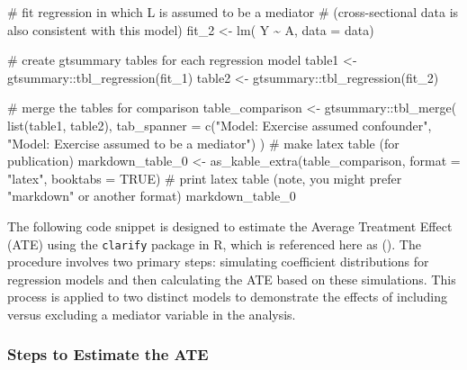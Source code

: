 \documentclass[
  singlecolumn]{article}
\newenvironment{Shaded}{}{}
\newcommand{\AttributeTok}[1]{\textcolor[rgb]{0.84,0.23,0.29}{#1}}
\newcommand{\CommentTok}[1]{\textcolor[rgb]{0.42,0.45,0.49}{#1}}
\newcommand{\ConstantTok}[1]{\textcolor[rgb]{0.00,0.36,0.77}{#1}}
\newcommand{\FunctionTok}[1]{\textcolor[rgb]{0.44,0.26,0.76}{#1}}
\newcommand{\NormalTok}[1]{\textcolor[rgb]{0.14,0.16,0.18}{#1}}
\newcommand{\OtherTok}[1]{\textcolor[rgb]{0.44,0.26,0.76}{#1}}
\newcommand{\SpecialCharTok}[1]{\textcolor[rgb]{0.00,0.36,0.77}{#1}}
\newcommand{\StringTok}[1]{\textcolor[rgb]{0.01,0.18,0.38}{#1}}
\begin{document}
\begin{Shaded}
\begin{Highlighting}[]
\CommentTok{\# fit regression in which L is assumed to be a mediator}
\CommentTok{\# (cross{-}sectional data is also consistent with this model)}
\NormalTok{fit\_2 }\OtherTok{\textless{}{-}} \FunctionTok{lm}\NormalTok{( Y }\SpecialCharTok{\textasciitilde{}}\NormalTok{ A, }\AttributeTok{data =}\NormalTok{ data)}

\CommentTok{\# create gtsummary tables for each regression model}
\NormalTok{table1 }\OtherTok{\textless{}{-}}\NormalTok{ gtsummary}\SpecialCharTok{::}\FunctionTok{tbl\_regression}\NormalTok{(fit\_1)}
\NormalTok{table2 }\OtherTok{\textless{}{-}}\NormalTok{ gtsummary}\SpecialCharTok{::}\FunctionTok{tbl\_regression}\NormalTok{(fit\_2)}

\CommentTok{\# merge the tables for comparison}
\NormalTok{table\_comparison }\OtherTok{\textless{}{-}}\NormalTok{ gtsummary}\SpecialCharTok{::}\FunctionTok{tbl\_merge}\NormalTok{(}
  \FunctionTok{list}\NormalTok{(table1, table2),}
  \AttributeTok{tab\_spanner =} \FunctionTok{c}\NormalTok{(}\StringTok{"Model: Exercise assumed confounder"}\NormalTok{, }
                  \StringTok{"Model: Exercise assumed to be a mediator"}\NormalTok{)}
\NormalTok{)}
\CommentTok{\# make latex table (for publication)}
\NormalTok{markdown\_table\_0 }\OtherTok{\textless{}{-}} \FunctionTok{as\_kable\_extra}\NormalTok{(table\_comparison, }
                                   \AttributeTok{format =} \StringTok{"latex"}\NormalTok{, }
                                   \AttributeTok{booktabs =} \ConstantTok{TRUE}\NormalTok{)}
\CommentTok{\# print latex table (note, you might prefer "markdown" or another format)                                }
\NormalTok{markdown\_table\_0}
\end{Highlighting}
\end{Shaded}

The following code snippet is designed to estimate the Average Treatment
Effect (ATE) using the \texttt{clarify} package in R, which is
referenced here as (). The procedure involves two primary steps: simulating coefficient
distributions for regression models and then calculating the ATE based
on these simulations. This process is applied to two distinct models to
demonstrate the effects of including versus excluding a mediator
variable in the analysis.

\subsubsection{Steps to Estimate the
ATE}\label{steps-to-estimate-the-ate}
\end{document}
